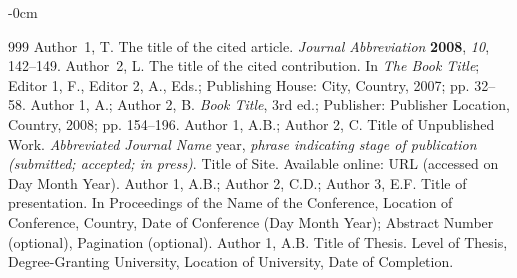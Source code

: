 \documentclass[journal,article,submit,moreauthors]{Definitions/mdpi}
\begin{document}
\begin{adjustwidth}{-\extralength}{0cm}



% 


\begin{thebibliography}{999}
Author~1, T. The title of the cited article. {\em Journal Abbreviation} {\bf 2008}, {\em 10}, 142--149.
Author~2, L. The title of the cited contribution. In {\em The Book Title}; Editor 1, F., Editor 2, A., Eds.; Publishing House: City, Country, 2007; pp. 32--58.
Author 1, A.; Author 2, B. \textit{Book Title}, 3rd ed.; Publisher: Publisher Location, Country, 2008; pp. 154--196.
Author 1, A.B.; Author 2, C. Title of Unpublished Work. \textit{Abbreviated Journal Name} year, \textit{phrase indicating stage of publication (submitted; accepted; in press)}.
Title of Site. Available online: URL (accessed on Day Month Year).
Author 1, A.B.; Author 2, C.D.; Author 3, E.F. Title of presentation. In Proceedings of the Name of the Conference, Location of Conference, Country, Date of Conference (Day Month Year); Abstract Number (optional), Pagination (optional).
Author 1, A.B. Title of Thesis. Level of Thesis, Degree-Granting University, Location of University, Date of Completion.
\end{thebibliography}


\end{adjustwidth}
\end{document}
